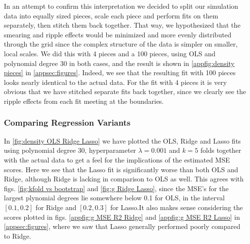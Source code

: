 \documentclass[aps,pra,english,notitlepage,reprint,nofootinbib]{revtex4-1}  %
\begin{document}
In an attempt to confirm this interpretation we decided to split our simulation data into equally sized pieces, scale each piece and perform fits on them separately, then stitch them back together. That way, we hypothesized that the smearing and ripple effects would be minimized and more evenly distributed through the grid since the complex structure of the data is simpler on smaller, local scales. We did this with 4 pieces and a 100 pieces, using OLS and polynomial degree 30 in both cases, and the result is shown in \cref{appfig:density pieces} in \cref{appsec:figures}. Indeed, we see that the resulting fit with 100 pieces looks nearly identical to the actual data. For the fit with 4 pieces it is very obvious that we have stitched separate fits back together, since we clearly see the ripple effects from each fit meeting at the boundaries.



\subsubsection{Comparing Regression Variants}
In \cref{fig:density OLS Ridge Lasso} we have plotted the OLS, Ridge and Lasso fits using polynomial degree 30, hyperparameter  $\lambda=0.001$ and $k=5$ folds together with the actual data to get a feel for the implications of the estimated MSE scores. Here we see that the Lasso fit is significantly worse than both OLS and Ridge, although Ridge is lacking in comparison to OLS as well. This agrees with figs. \cref{fig:kfold vs bootstrap} and \cref{fig:g Ridge Lasso}, since the MSE's for the largest plynomial degrees lie somewhere below 0.1 for OLS, in the interval $[0.1,0.2]$ for Ridge and $[0.2,0.3]$ for Lasso.It also makes sense considering the scores plotted in figs. \ref{appfig:g MSE R2 Ridge} and \ref{appfig:g MSE R2 Lasso} in \cref{appsec:figures}, where we saw that Lasso generally performed poorly compared to Ridge.
\end{document}
